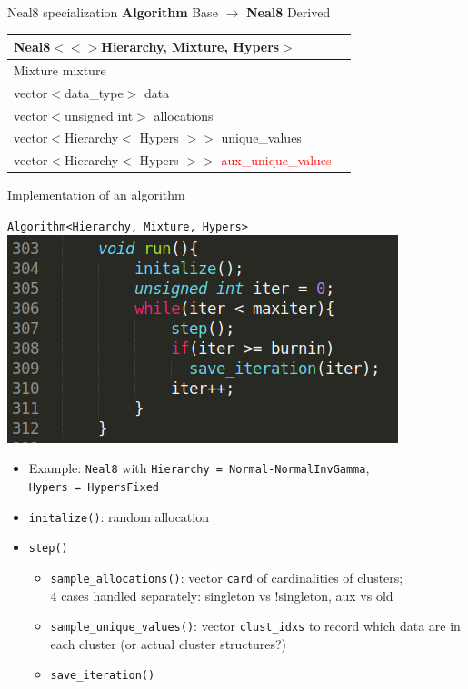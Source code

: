 \begin{frame}{Neal8 specialization}
\textbf{Algorithm} Base $\rightarrow$ \textbf{Neal8} Derived

\begin{center}
	\begin{tabular}{ | l | c| } 
		\hline
		Neal8$<<>$Hierarchy, Mixture, Hypers$>$ \\
		\hline
		Mixture mixture\\
		vector$<$data\_type$>$ data  \\ 
		vector$<$unsigned int$>$ allocations  \\
		vector$<$Hierarchy$<$ Hypers $>>$ unique\_values \\
		vector$<$Hierarchy$<$ Hypers $>>$ \textcolor{red}{aux\_unique\_values} \\
		\hline
	\end{tabular}
\end{center}

\end{frame}



\begin{frame}{Implementation of an algorithm}
	\begin{center}
		\texttt{Algorithm<Hierarchy, Mixture, Hypers>}
		\includegraphics[scale=0.35]{../etc/neal8_2.png}
	\end{center}
	\begin{itemize}
		\item Example: \texttt{Neal8} with \texttt{Hierarchy = Normal-NormalInvGamma}, \\ \texttt{Hypers = HypersFixed}
		\item \texttt{initalize()}: random allocation
		\item \texttt{step()}
		\begin{itemize}
			\item \texttt{sample\_allocations()}: vector \texttt{card} of cardinalities of clusters; \\
			4 cases handled separately: singleton vs !singleton, aux vs old
			\item \texttt{sample\_unique\_values()}: vector \texttt{clust\_idxs} to record which data are in each cluster (or actual cluster structures?)
			\item \texttt{save\_iteration()}
		\end{itemize}
	\end{itemize}
\end{frame}


